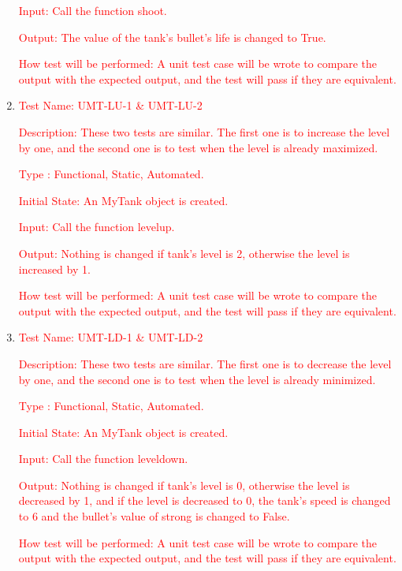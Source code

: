 \documentclass[12pt, titlepage]{article}
\begin{document}
\begin{enumerate}
\textcolor{red}{Input: Call the function shoot.}

\textcolor{red}{Output: The value of the tank's bullet's life is changed to True.}

\textcolor{red}{How test will be performed: A unit test case will be wrote to compare the output with the expected output, and the test will pass if they are equivalent.}\\

\item{\textcolor{red}{Test Name: UMT-LU-1 \& UMT-LU-2}}

\textcolor{red}{Description: These two tests are similar. The first one is to increase the level by one, and the second one is to test when the level is already maximized.}

\textcolor{red}{Type : Functional, Static, Automated.}

\textcolor{red}{Initial State: An MyTank object is created.}

\textcolor{red}{Input: Call the function levelup.}

\textcolor{red}{Output: Nothing is changed if tank's level is 2, otherwise the level is increased by 1.}

\textcolor{red}{How test will be performed: A unit test case will be wrote to compare the output with the expected output, and the test will pass if they are equivalent.}\\

\item{\textcolor{red}{Test Name: UMT-LD-1 \& UMT-LD-2}}

\textcolor{red}{Description: These two tests are similar. The first one is to decrease the level by one, and the second one is to test when the level is already minimized.}

\textcolor{red}{Type : Functional, Static, Automated.}

\textcolor{red}{Initial State: An MyTank object is created.}

\textcolor{red}{Input: Call the function leveldown.}

\textcolor{red}{Output: Nothing is changed if tank's level is 0, otherwise the level is decreased by 1, and if the level is decreased to 0, the tank's speed is changed to 6 and the bullet's value of strong is changed to False.}

\textcolor{red}{How test will be performed: A unit test case will be wrote to compare the output with the expected output, and the test will pass if they are equivalent.}\\


\end{enumerate}
\end{document}
